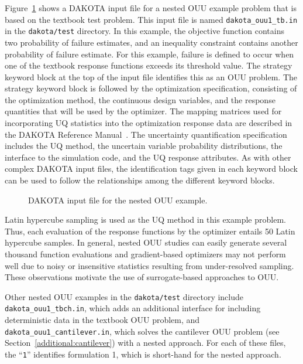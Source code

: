 Figure~\ref{adv_models:figure09} shows a DAKOTA input file for a nested
OUU example problem that is based on the textbook test problem. This
input file is named \texttt{dakota\_ouu1\_tb.in} in the
\texttt{dakota/test} directory.  In this example, the objective
function contains two probability of failure estimates, and an
inequality constraint contains another probability of failure
estimate. For this example, failure is defined to occur when one of
the textbook response functions exceeds its threshold value. The
strategy keyword block at the top of the input file identifies this as
an OUU problem. The strategy keyword block is followed by the
optimization specification, consisting of the optimization method, the
continuous design variables, and the response quantities that will be
used by the optimizer. The mapping matrices used for incorporating UQ
statistics into the optimization response data are described in the
DAKOTA Reference Manual~\cite{RefMan}. The uncertainty quantification
specification includes the UQ method, the uncertain variable
probability distributions, the interface to the simulation code, and
the UQ response attributes. As with other complex DAKOTA input files,
the identification tags given in each keyword block can be used to
follow the relationships among the different keyword blocks.

\begin{figure}
  \centering
  \begin{bigbox}
    \begin{tiny}
    \end{tiny}
  \end{bigbox}
  \caption{DAKOTA input file for the nested OUU example.}
  \label{adv_models:figure09}
\end{figure}

Latin hypercube sampling is used as the UQ method in this example
problem. Thus, each evaluation of the response functions by the
optimizer entails 50 Latin hypercube samples. In general, nested OUU
studies can easily generate several thousand function evaluations and
gradient-based optimizers may not perform well due to noisy or
insensitive statistics resulting from under-resolved sampling. These
observations motivate the use of surrogate-based approaches to OUU.

Other nested OUU examples in the \texttt{dakota/test} directory
include \texttt{dakota\_ouu1\_tbch.in}, which adds an additional
interface for including deterministic data in the textbook OUU
problem, and\\ \texttt{dakota\_ouu1\_cantilever.in}, which solves the
cantilever OUU problem (see Section~\ref{additional:cantilever}) with
a nested approach. For each of these files, the ``\texttt{1}''
identifies formulation 1, which is short-hand for the nested approach.

